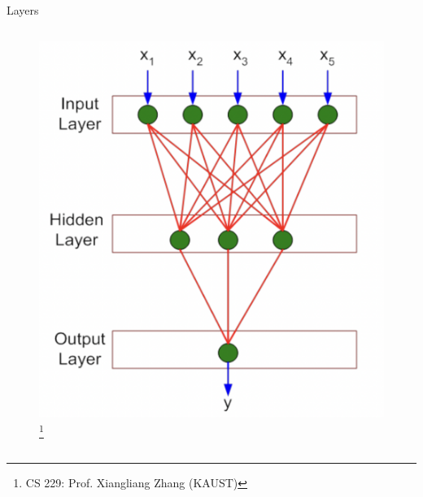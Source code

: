 \documentclass[10pt, hyperref={colorlinks = true,linkcolor = blue}]{beamer}
\begin{document}
{{{\begin{frame}{Layers}
\begin{columns}
        \begin{column}{0.4\textwidth}
            \begin{figure}
                \includegraphics[width=\linewidth]{figures/NNs}\footnote{CS 229: Prof. Xiangliang Zhang (KAUST)}
            \end{figure}
        \end{column}
    \end{columns}
\end{frame}

}}}
\end{document}
